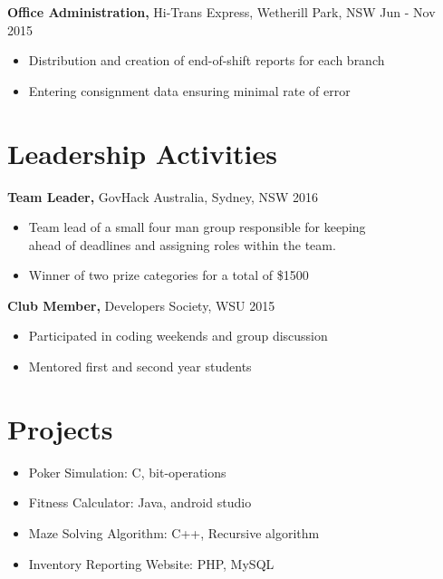 \documentclass[margin]{res}
\begin{document}
\begin{resume}
{\bf Office Administration,} Hi-Trans Express, Wetherill Park, NSW \hfill Jun - Nov 2015
                \begin{itemize} \itemsep -2pt
                 \item  Distribution and creation of end-of-shift reports for each branch

                 \item Entering consignment data ensuring minimal rate of error

		 \end{itemize}

\section{Leadership   Activities}
               {\bf Team Leader,} GovHack Australia, Sydney, NSW    \hfill        2016
                \begin{itemize} \itemsep -2pt
              \item Team lead of a small four man group responsible for keeping \\
                    ahead of deadlines and assigning roles within the team.

              \item Winner of two prize categories for a total of {\$}1500

		 \end{itemize}

		{\bf Club Member,} Developers Society, WSU \hfill   2015
                \begin{itemize} \itemsep -2pt
                 \item Participated in coding weekends and group discussion

                 \item Mentored first and second year students
		 \end{itemize}

\section{Projects}
                  \begin{itemize} \itemsep -2pt
                  \item Poker Simulation: C, bit-operations
                  \item Fitness Calculator: Java, android studio
                  \item Maze Solving Algorithm: C++, Recursive algorithm
                  \item Inventory Reporting Website: PHP, MySQL


\end{itemize}
\end{resume}
\end{document}
